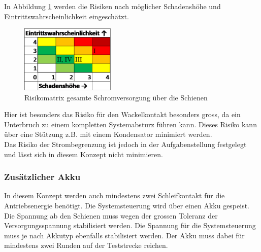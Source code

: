 \documentclass[../../../main.tex]{subfiles}
\begin{document}
    In Abbildung \ref{fig:strom_risikomatrix_schienen} werden die Risiken nach möglicher Schadenshöhe und Eintrittswahrscheinlichkeit eingeschätzt.

    \begin{figure}[H]
        \centering
        \includegraphics[width=0.4\textwidth]{Strom_Risiko_Schienen.png}
        \caption {Risikomatrix gesamte Schromversorgung über die Schienen}
        \label{fig:strom_risikomatrix_schienen}
    \end{figure}

    Hier ist besonders das Risiko für den Wackelkontakt besonders gross, da ein Unterbruch zu einem kompletten Systemabsturz führen kann. Dieses Risiko kann über eine Stützung z.B. mit einem Kondensator minimiert werden.\\
    Das Risiko der Strombegrenzung ist jedoch in der Aufgabenstellung festgelegt und lässt sich in diesem Konzept nicht minimieren.

    \subsubsection{Zusätzlicher Akku}
    In diesem Konzept werden auch mindestens zwei Schleifkontakt für die Antriebsenergie benötigt. Die Systemsteuerung wird über einen Akku gespeist. Die Spannung ab den Schienen muss wegen der grossen Toleranz der Versorgungsspannung stabilisiert werden. Die Spannung für die Systemsteuerung muss je nach Akkutyp ebenfalls stabilisiert werden.
    Der Akku muss dabei für mindestens zwei Runden auf der Teststrecke reichen.
\end{document}
